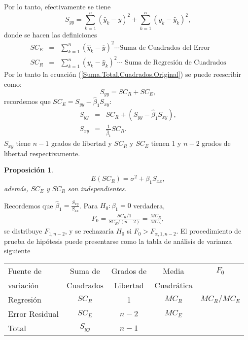 \documentclass[a4paper]{report} %
\newtheorem{Prop}{Proposici\'on}[chapter]
\begin{document}
Por lo tanto, efectivamente se tiene
\begin{equation}\label{Suma.Total.Cuadrados.Original}
S_{yy}=\sum_{k=1}^{n}\left(\hat{y}_{k}-\overline{y}\right)^{2}+\sum_{k=1}^{n}\left(y_{k}-\hat{y}_{k}\right)^{2},
\end{equation}
donde se hacen las definiciones
\begin{eqnarray}
SC_{E}&=&\sum_{k=1}^{n}\left(\hat{y}_{k}-\overline{y}\right)^{2}\cdots\textrm{Suma de Cuadrados del Error}\\
SC_{R}&=&\sum_{k=1}^{n}\left(y_{k}-\hat{y}_{k}\right)^{2}\cdots\textrm{ Suma de Regresi\'on de Cuadrados}
\end{eqnarray}
Por lo tanto la ecuaci\'on (\ref{Suma.Total.Cuadrados.Original}) se puede reescribir como: 
\begin{equation}\label{Suma.Total.Cuadrados.Dos.Original}
S_{yy}=SC_{R}+SC_{E},
\end{equation}
recordemos que $SC_{E}=S_{yy}-\hat{\beta}_{1}S_{xy}$:
\begin{eqnarray*}
S_{yy}&=&SC_{R}+\left( S_{yy}-\hat{\beta}_{1}S_{xy}\right),\\
S_{xy}&=&\frac{1}{\hat{\beta}_{1}}SC_{R}.
\end{eqnarray*}
$S_{xy}$ tiene $n-1$ grados de libertad y $SC_{R}$ y $SC_{E}$ tienen 1 y $n-2$ grados de libertad respectivamente.

\begin{Prop}
\begin{equation}
E\left(SC_{R}\right)=\sigma^{2}+\beta_{1}S_{xx},
\end{equation}
adem\'as, $SC_{E}$ y $SC_{R}$ son independientes.
\end{Prop}
Recordemos que $\hat{\beta}_{1}=\frac{S_{xy}}{S_{xx}}$. Para $H_{0}:\beta_{1}=0$ verdadera,
\begin{eqnarray*}
F_{0}=\frac{SC_{R}/1}{SC_{E}/(n-2)}=\frac{MC_{R}}{MC_{E}},
\end{eqnarray*}
se distribuye $F_{1,n-2}$, y se rechazar\'ia $H_{0}$ si $F_{0}>F_{\alpha,1,n-2}$. El procedimiento de prueba de hip\'otesis puede presentarse como la tabla de an\'alisis de varianza siguiente

\begin{center}
\begin{tabular}{lcccc}\hline
Fuente de & Suma de  &  Grados de  & Media  & $F_{0}$ \\ 
 variaci\'on & Cuadrados & Libertad & Cuadr\'atica & \\\hline
 Regresi\'on & $SC_{R}$ & 1 & $MC_{R}$  & $MC_{R}/MC_{E}$\\
 Error Residual & $SC_{E}$ & $n-2$ & $MC_{E}$ & \\\hline
 Total & $S_{yy}$ & $n-1$ & & \\\hline
\end{tabular} 
\end{center}
\end{document}
